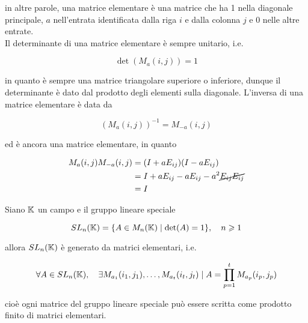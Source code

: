 in altre parole, una matrice elementare è una matrice che ha 1 nella diagonale principale, $ a $ nell'entrata identificata dalla riga $ i $ e dalla colonna $ j $ e 0 nelle altre entrate.\\
Il determinante di una matrice elementare è sempre unitario, i.e.

\begin{equation}
	\det(M_{a}(i,j)) = 1
\end{equation}

in quanto è sempre una matrice triangolare superiore o inferiore, dunque il determinante è dato dal prodotto degli elementi sulla diagonale. L'inversa di una matrice elementare è data da

\begin{equation}
	(M_{a}(i,j))^{-1} = M_{-a}(i,j)
\end{equation}

ed è ancora una matrice elementare, in quanto

\begin{align}
	\begin{split}
		M_{a}(i,j) M_{-a}(i,j) &= (I + a E_{ij}) (I - a E_{ij})\\
		&= I + a E_{ij} - a E_{ij} - a^{2} \cancel{E_{ij} E_{ij}}\\
		&= I
	\end{split}
\end{align}

\begin{theorem}
	Siano $ \mathbb{K} $ un campo e il gruppo lineare speciale
	
	\begin{equation}
		SL_{n}(\K) = \{ A \in M_{n}(\K) \mid \det(A) = 1 \} \qcomma n \geqslant 1
	\end{equation}

	allora $ SL_{n}(\mathbb{K}) $ è generato da matrici elementari, i.e.
	
	\begin{equation}
		\forall A \in SL_{n}(\K) \qcomma \exists M_{a_{1}}(i_{1},j_{1}), \dots, M_{a_{t}}(i_{t},j_{t}) \mid A = \prod_{p=1}^{t} M_{a_{p}}(i_{p},j_{p})
	\end{equation}

	cioè ogni matrice del gruppo lineare speciale può essere scritta come prodotto finito di matrici elementari.
\end{theorem}

